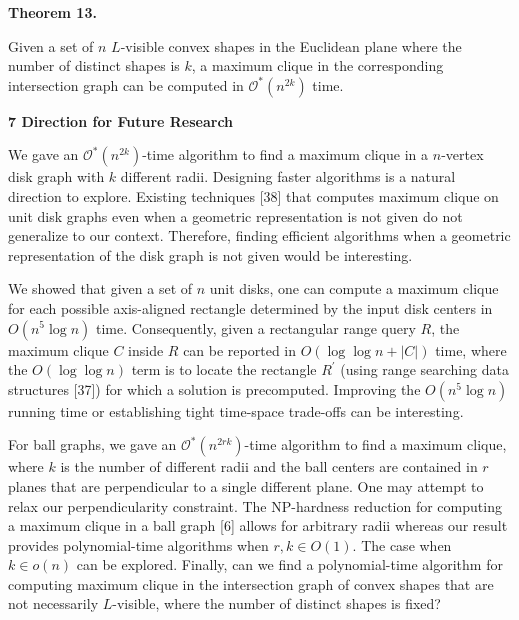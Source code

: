 \par
\par
\par\medskip\noindent\textbf{Theorem 13.}\par
Given a set of $n$ $L$-visible convex shapes in the Euclidean plane where the number of distinct shapes is $k$, a maximum clique in the corresponding intersection graph can be computed in $\mathcal{O}^{*}(n^{2k})$ time.
\par
\par
\par
\par
\par
\par\medskip\noindent\textbf{7 Direction for Future Research}\par
We gave an $\mathcal{O}^{*}(n^{2k})$-time algorithm to find a maximum clique in a $n$-vertex disk graph with $k$ different radii. Designing faster algorithms is a natural direction to explore. Existing techniques [38] that computes maximum clique on unit disk graphs even when a geometric representation is not given do not generalize to our context. Therefore, finding efficient algorithms when a geometric representation of the disk graph is not given would be interesting.
\par
\par
We showed that given a set of $n$ unit disks, one can compute a maximum clique for each possible axis-aligned rectangle determined by the input disk centers in $O(n^{5}\log n)$ time. Consequently, given a rectangular range query $R$, the maximum clique $C$ inside $R$ can be reported in $O(\log\log n+|C|)$ time, where the $O(\log\log n)$ term is to locate the rectangle $R^{\prime}$ (using range searching data structures [37]) for which a solution is precomputed. Improving the $O(n^{5}\log n)$ running time or establishing tight time-space trade-offs can be interesting.
\par
\par
For ball graphs, we gave an $\mathcal{O}^{*}(n^{2rk})$-time algorithm to find a maximum clique, where $k$ is the number of different radii and the ball centers are contained in $r$ planes that are perpendicular to a single different plane. One may attempt to relax our perpendicularity constraint. The NP-hardness reduction for computing a maximum clique in a ball graph [6] allows for arbitrary radii whereas our result provides polynomial-time algorithms when $r,k\in O(1)$. The case when $k\in o(n)$ can be explored. Finally, can we find a polynomial-time algorithm for computing maximum clique in the intersection graph of convex shapes that are not necessarily $L$-visible, where the number of distinct shapes is fixed?
